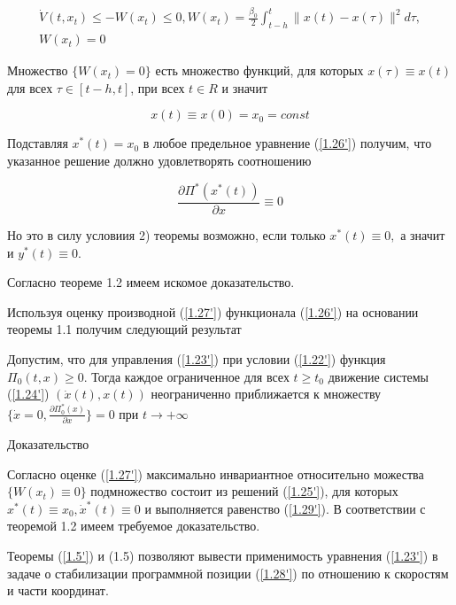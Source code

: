 \begin{equation} \label{1.27'}
	\begin{array}{c}
	\displaystyle \dot V(t, x_t) \le - W(x_t) \le 0, W(x_t) = \frac{\beta_0}{2} \int_{t - h}^{t} \| x(t) - x(\tau) \| ^ 2 d \tau,\\
	W(x_t) = 0
	\end{array}
\end{equation}

Множество $\{ W(x_t) = 0 \}$ есть множество функций, для которых $x(\tau) \equiv x(t)$ для всех $\tau \in [t - h, t]$, при всех $t \in R$ и значит 

\begin{equation} \label{1.28'}
x(t) \equiv x(0) = x_0 = const
\end{equation}

Подставляя $x^{*}(t) = x_0$ в любое предельное уравнение (\ref{1.26'}) получим, что указанное решение должно удовлетворять соотношению 

\begin{equation} \label{1.29'}
\frac{\partial \Pi^{*} (x^{*} (t))}{\partial x} \equiv 0
\end{equation}

Но это в силу условиия 2) теоремы возможно, если только $x^{*} (t) \equiv 0,$ а значит и $y^{*}(t) \equiv 0.$

Согласно теореме 1.2 имеем искомое доказательство.

Используя оценку производной (\ref{1.27'}) функционала (\ref{1.26'}) на основании теоремы 1.1 получим следующий результат

\begin{theorem}\label{t-1.7}
Допустим, что для управления (\ref{1.23'}) при условии (\ref{1.22'}) функция $\Pi_0 (t, x) \ge 0$. Тогда каждое ограниченное для всех $t \ge t_0$ движение системы (\ref{1.24'}) $(\dot x(t), x(t))$ неограниченно приближается к множеству $ \lbrace \dot x = 0, \frac{\partial \Pi_0^{*} (x)}{\partial x} \rbrace = 0$ при $t \to + \infty$
\end{theorem}

Доказательство

Согласно оценке (\ref{1.27'}) максимально инвариантное относительно можества $\{ W(x_t) \equiv 0 \}$ подмножество состоит из решений (\ref{1.25'}), для которых $x^{*} (t) \equiv x_0, \dot x^{*}(t) \equiv 0$ и выполняется равенство (\ref{1.29'}). В соответствии с теоремой 1.2 имеем требуемое доказательство.

Теоремы (\ref{1.5'}) и (1.5) позволяют вывести применимость уравнения (\ref{1.23'}) в задаче о стабилизации программной позиции (\ref{1.28'}) по отношению к скоростям и части координат. 

